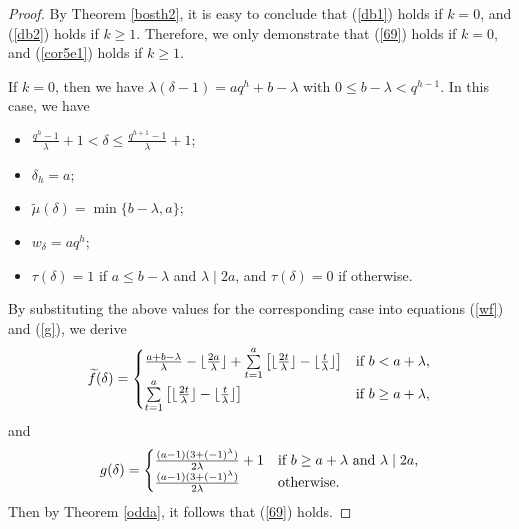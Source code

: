 \documentclass[journal,onecolumn]{IEEEtran}
\begin{document}
\begin{proof}
By Theorem \ref{bosth2}, it is easy to conclude that (\ref{db1}) holds if $k=0$, and (\ref{db2}) holds if $k\geq 1$. Therefore, we only demonstrate that (\ref{69}) holds if $k=0$, and   (\ref{cor5e1}) holds if $k\geq 1$.

    If $k=0$, then we have $\lambda(\delta-1) = a q^h+b-\lambda$ with  $0\leq b-\lambda<q^{h-1}$. In this case, we have  
    \begin{itemize}
   \item  $\frac{q^h-1}{\lambda}+1<\delta\leq \frac{q^{h+1}-1}{\lambda}+1$;
   \item $\delta_h=a$;
        \item $\widetilde{\mu}(
    \delta)=\min\{b-\lambda, a\}$;
    \item $w_{\delta}=aq^h$;
    \item $\tau(\delta)=1$ if $a \leq b-\lambda$ and $\lambda\mid 2a$, and $\tau(\delta)=0$ if otherwise. 
    \end{itemize}
By substituting   the above values  for the corresponding  case into equations (\ref{wf}) and (\ref{g}), we derive  \begin{equation}\notag
    \widetilde{f}(\delta)=\begin{cases}
    \frac{a+b-\lambda}{\lambda}-\lfloor\frac{2a}{\lambda}\rfloor+ \sum\limits_{t=1}^a\left[ \lfloor \frac{2t}{\lambda}\rfloor -  \lfloor \frac{t}{\lambda}\rfloor \right]& \hbox{if } b<a+\lambda,\\
   \sum\limits_{t=1}^a\left[ \lfloor \frac{2t}{\lambda}\rfloor -  \lfloor \frac{t}{\lambda}\rfloor \right]& \hbox{if }  b\geq  a+\lambda, 
    \end{cases}
\end{equation}
and 
\begin{equation}\notag
g(\delta)=\begin{cases}
    \frac{(a-1)(3+(-1)^{\lambda})}{2\lambda}+1& \hbox{if }b\geq a+\lambda \hbox{ and } \lambda\mid  2a,\\
  \frac{(a-1)(3+(-1)^{\lambda})}{2\lambda}& \hbox{otherwise}. 
    \end{cases}
\end{equation}
Then by Theorem \ref{odda}, it follows that (\ref{69})  holds. 


\end{proof}
\end{document}
